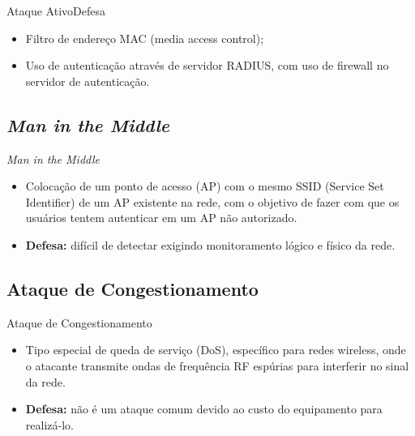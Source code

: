\begin{frame}{Ataque Ativo}{Defesa}

  \begin{itemize}[<+->]
  \item Filtro de endereço MAC (media access control);
  \item Uso de autenticação através de servidor RADIUS, com uso de
    firewall no servidor de autenticação.
  \end{itemize}
  
\end{frame}

\subsection{{\em Man in the Middle}}

\begin{frame}{\em Man in the Middle}
  
  \begin{itemize}[<+->]
  \item Colocação de um ponto de acesso (AP) com o mesmo SSID (Service
    Set Identifier) de um AP existente na rede, com o objetivo de
    fazer com que os usuários tentem autenticar em um AP não
    autorizado.
  \item {\bf Defesa:} difícil de detectar exigindo monitoramento
    lógico e físico da rede.
  \end{itemize}
\end{frame}

\subsection{Ataque de Congestionamento}

\begin{frame}{Ataque de Congestionamento}

  \begin{itemize}[<+->]
  \item Tipo especial de queda de serviço (DoS), específico para redes
    wireless, onde o atacante transmite ondas de frequência RF
    espúrias para interferir no sinal da rede.
  \item {\bf Defesa:} não é um ataque comum devido ao custo do
    equipamento para realizá-lo.
  \end{itemize}
  
\end{frame}

